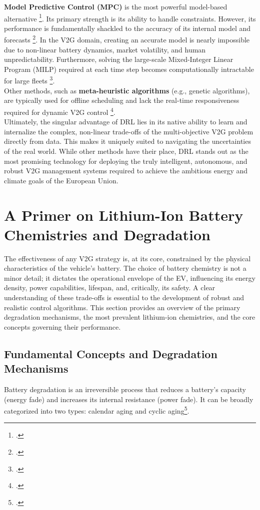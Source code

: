 \noindent
\textbf{Model Predictive Control (MPC)} is the most powerful model-based alternative \footcite{alsabbagh2022reinforcement}. Its primary strength is its ability to handle constraints. However, its performance is fundamentally shackled to the accuracy of its internal model and forecasts \footcite{faggio2023design}. In the V2G domain, creating an accurate model is nearly impossible due to non-linear battery dynamics, market volatility, and human unpredictability. Furthermore, solving the large-scale Mixed-Integer Linear Program (MILP) required at each time step becomes computationally intractable for large fleets \footcite{schwenk2022computationally}.
\\
\noindent
Other methods, such as \textbf{meta-heuristic algorithms} (e.g., genetic algorithms), are typically used for offline scheduling and lack the real-time responsiveness required for dynamic V2G control \footcite{kumar2024integration}.
\\
\noindent
Ultimately, the singular advantage of DRL lies in its native ability to learn and internalize the complex, non-linear trade-offs of the multi-objective V2G problem directly from data. This makes it uniquely suited to navigating the uncertainties of the real world. While other methods have their place, DRL stands out as the most promising technology for deploying the truly intelligent, autonomous, and robust V2G management systems required to achieve the ambitious energy and climate goals of the European Union.

\section{A Primer on Lithium-Ion Battery Chemistries and Degradation}
The effectiveness of any V2G strategy is, at its core, constrained by the physical characteristics of the vehicle's battery. The choice of battery chemistry is not a minor detail; it dictates the operational envelope of the EV, influencing its energy density, power capabilities, lifespan, and, critically, its safety. A clear understanding of these trade-offs is essential to the development of robust and realistic control algorithms.
This section provides an overview of the primary degradation mechanisms, the most prevalent lithium-ion chemistries, and the core concepts governing their performance.

\subsection{Fundamental Concepts and Degradation Mechanisms}
Battery degradation is an irreversible process that reduces a battery's capacity (energy fade) and increases its internal resistance (power fade). It can be broadly categorized into two types: calendar aging and cyclic aging\footcite{birkl2017degradation}.

